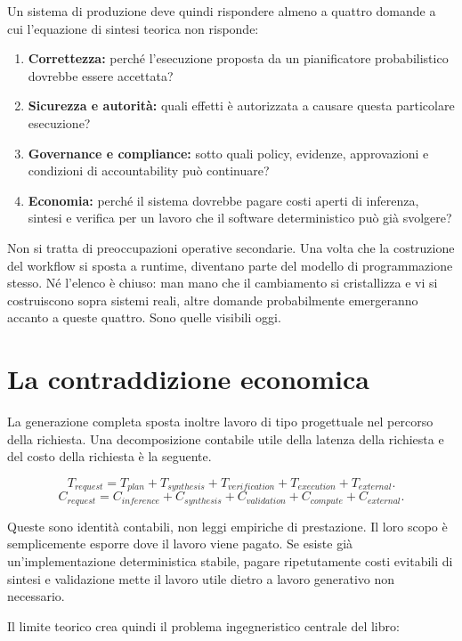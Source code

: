 \documentclass[10pt,oneside,openany]{book}
\begin{document}
Un sistema di produzione deve quindi rispondere almeno a quattro domande a cui l'equazione di sintesi teorica non risponde:

\begin{enumerate}
\item \textbf{Correttezza:} perché l'esecuzione proposta da un pianificatore probabilistico dovrebbe essere accettata?
\item \textbf{Sicurezza e autorità:} quali effetti è autorizzata a causare questa particolare esecuzione?
\item \textbf{Governance e compliance:} sotto quali policy, evidenze, approvazioni e condizioni di accountability può continuare?
\item \textbf{Economia:} perché il sistema dovrebbe pagare costi aperti di inferenza, sintesi e verifica per un lavoro che il software deterministico può già svolgere?
\end{enumerate}

Non si tratta di preoccupazioni operative secondarie. Una volta che la costruzione del workflow si sposta a runtime, diventano parte del modello di programmazione stesso. Né l'elenco è chiuso: man mano che il cambiamento si cristallizza e vi si costruiscono sopra sistemi reali, altre domande probabilmente emergeranno accanto a queste quattro. Sono quelle visibili oggi.

\section{La contraddizione economica}

La generazione completa sposta inoltre lavoro di tipo progettuale nel percorso della richiesta. Una decomposizione contabile utile della latenza della richiesta e del costo della richiesta è la seguente.
\begin{formulabox}
\[
T_{request}
=
T_{plan}+T_{synthesis}+T_{verification}+T_{execution}+T_{external}.
\]
\[
C_{request}
=
C_{inference}+C_{synthesis}+C_{validation}+C_{compute}+C_{external}.
\]
\end{formulabox}
Queste sono identità contabili, non leggi empiriche di prestazione. Il loro scopo è semplicemente esporre dove il lavoro viene pagato. Se esiste già un'implementazione deterministica stabile, pagare ripetutamente costi evitabili di sintesi e validazione mette il lavoro utile dietro a lavoro generativo non necessario.

Il limite teorico crea quindi il problema ingegneristico centrale del libro:
\end{document}
